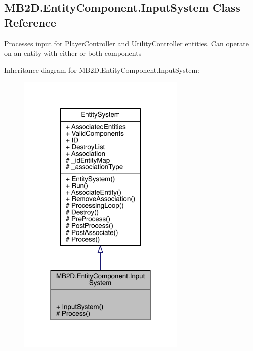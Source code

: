 \hypertarget{class_m_b2_d_1_1_entity_component_1_1_input_system}{}\subsection{M\+B2\+D.\+Entity\+Component.\+Input\+System Class Reference}
\label{class_m_b2_d_1_1_entity_component_1_1_input_system}


Processes input for \hyperlink{class_m_b2_d_1_1_entity_component_1_1_player_controller}{Player\+Controller} and \hyperlink{class_m_b2_d_1_1_entity_component_1_1_utility_controller}{Utility\+Controller} entities. Can operate on an entity with either or both components  




Inheritance diagram for M\+B2\+D.\+Entity\+Component.\+Input\+System\+:
\nopagebreak
\begin{figure}[H]
\begin{center}
\leavevmode
\includegraphics[width=228pt]{class_m_b2_d_1_1_entity_component_1_1_input_system__inherit__graph}
\end{center}
\end{figure}


